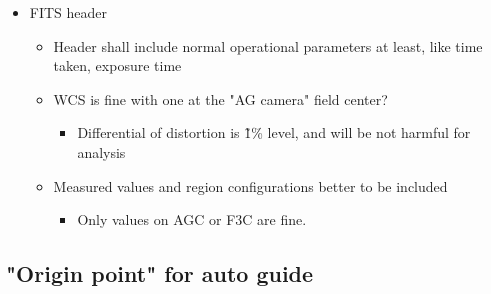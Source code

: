 \documentclass[a4paper,notitlepage]{article}
\begin{document}
\begin{itemize}
  \item FITS header
  \begin{itemize}
    \item Header shall include normal operational parameters at least, like time taken, exposure time
    \item WCS is fine with one at the "AG camera" field center?
    \begin{itemize}
      \item Differential of distortion is \~1\% level, and will be not harmful for analysis
    \end{itemize}
    \item Measured values and region configurations better to be included
    \begin{itemize}
      \item Only values on AGC or F3C are fine.
    \end{itemize}
  \end{itemize}
\end{itemize}

\subsection{"Origin point" for auto guide}
\end{document}
